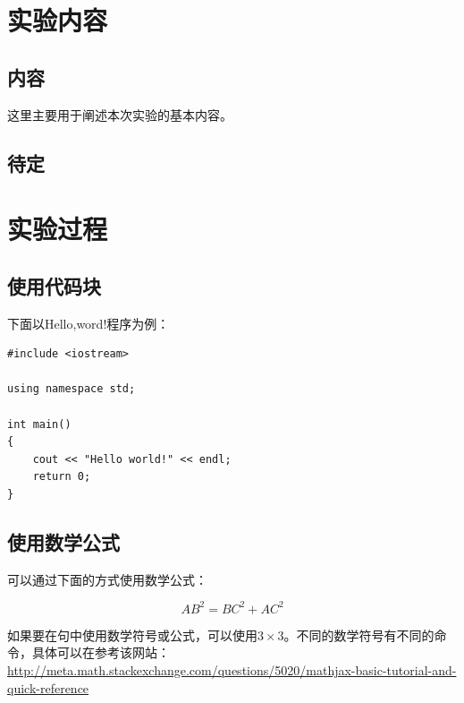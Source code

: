 \documentclass[hyperref,UTF8]{ctexart}
\begin{document}
\section{实验内容}

\subsection{内容}

这里主要用于阐述本次实验的基本内容。

\subsection{待定}


\section{实验过程}

\subsection{使用代码块}

下面以Hello,word!程序为例：

\begin{lstlisting}
#include <iostream>

using namespace std;

int main()
{
    cout << "Hello world!" << endl;
    return 0;
}
\end{lstlisting}

\subsection{使用数学公式}

可以通过下面的方式使用数学公式：

\begin{equation}
AB^2 = BC^2 + AC^2
\end{equation}

如果要在句中使用数学符号或公式，可以使用$3 \times 3$。不同的数学符号有不同的命令，具体可以在参考该网站：\url{http://meta.math.stackexchange.com/questions/5020/mathjax-basic-tutorial-and-quick-reference}
\end{document}
